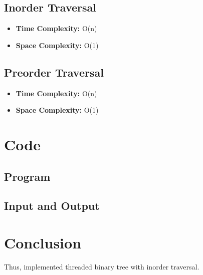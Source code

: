 \documentclass[11pt]{article}
\begin{document}
\subsection{Inorder Traversal}

\begin{itemize}
    \item \textbf{Time Complexity:} O(n)
    \item \textbf{Space Complexity:} O(1)
\end{itemize}

\subsection{Preorder Traversal}

\begin{itemize}
    \item \textbf{Time Complexity:} O(n)
    \item \textbf{Space Complexity:} O(1)
\end{itemize}

\section{Code}

\subsection{Program}


\subsection{Input and Output}


\section{Conclusion}
Thus, implemented threaded binary tree with inorder traversal.
\clearpage
\end{document}

